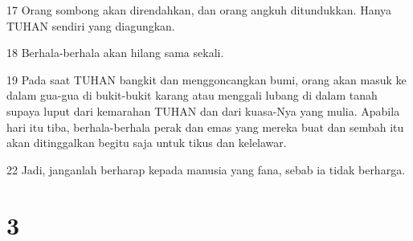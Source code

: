 \par 17 Orang sombong akan direndahkan, dan orang angkuh ditundukkan. Hanya TUHAN sendiri yang diagungkan.
\par 18 Berhala-berhala akan hilang sama sekali.
\par 19 Pada saat TUHAN bangkit dan menggoncangkan bumi, orang akan masuk ke dalam gua-gua di bukit-bukit karang atau menggali lubang di dalam tanah supaya luput dari kemarahan TUHAN dan dari kuasa-Nya yang mulia. Apabila hari itu tiba, berhala-berhala perak dan emas yang mereka buat dan sembah itu akan ditinggalkan begitu saja untuk tikus dan kelelawar.
\par 22 Jadi, janganlah berharap kepada manusia yang fana, sebab ia tidak berharga.

\chapter{3}

